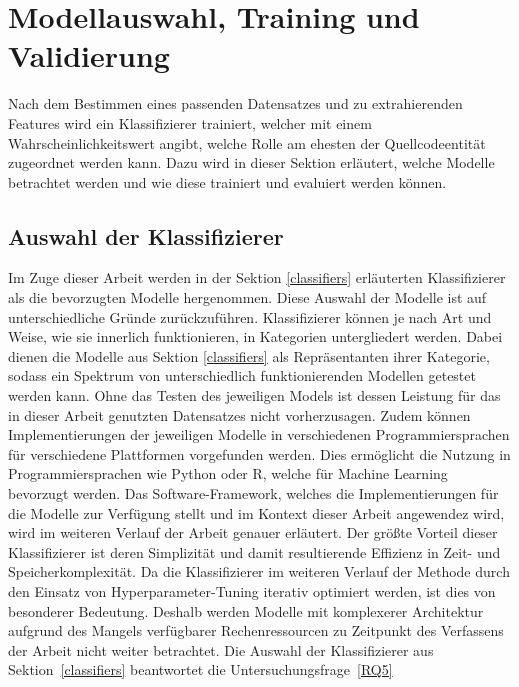 \section{Modellauswahl, Training und Validierung}
Nach dem Bestimmen eines passenden Datensatzes und zu extrahierenden Features wird ein Klassifizierer trainiert, welcher mit einem Wahrscheinlichkeitswert angibt, welche Rolle am ehesten der Quellcodeentität zugeordnet werden kann.
Dazu wird in dieser Sektion erläutert, welche Modelle betrachtet werden und wie diese trainiert und evaluiert werden können. 


\subsection*{Auswahl der Klassifizierer}
Im Zuge dieser Arbeit werden in der Sektion \ref{classifiers} erläuterten Klassifizierer als die bevorzugten Modelle hergenommen. Diese Auswahl der Modelle ist auf unterschiedliche Gründe zurückzuführen.
Klassifizierer können je nach Art und Weise, wie sie innerlich funktionieren, in Kategorien untergliedert werden. Dabei dienen die Modelle aus Sektion \ref{classifiers} als Repräsentanten ihrer Kategorie, sodass ein Spektrum von unterschiedlich funktionierenden Modellen getestet werden kann.
Ohne das Testen des jeweiligen Models ist dessen Leistung für das in dieser Arbeit genutzten Datensatzes nicht vorherzusagen. Zudem können Implementierungen der jeweiligen Modelle in verschiedenen Programmiersprachen für verschiedene Plattformen vorgefunden werden.
Dies ermöglicht die Nutzung in Programmiersprachen wie Python oder R, welche für Machine Learning bevorzugt werden. Das Software-Framework, welches die Implementierungen für die Modelle zur Verfügung stellt und im Kontext dieser Arbeit angewendez wird, wird im weiteren Verlauf der Arbeit genauer erläutert.
Der größte Vorteil dieser Klassifizierer ist deren Simplizität und damit resultierende Effizienz in Zeit- und Speicherkomplexität. Da die Klassifizierer im weiteren Verlauf der Methode durch den Einsatz von Hyperparameter-Tuning iterativ optimiert werden, ist dies von besonderer Bedeutung.
Deshalb werden Modelle mit komplexerer Architektur aufgrund des Mangels verfügbarer Rechenressourcen zu Zeitpunkt des Verfassens der Arbeit nicht weiter betrachtet. 
Die Auswahl der Klassifizierer aus Sektion~\ref{classifiers} beantwortet die Untersuchungsfrage~\ref{RQ5}


